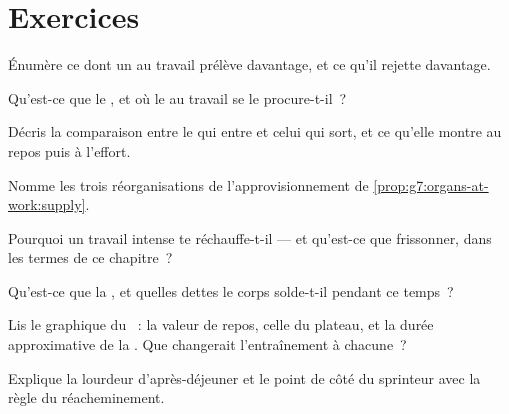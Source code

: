 \section{Exercices}

\begin{exercise}[$\star$]\label{exo:g7:organs-at-work:1}
Énumère ce dont un  au travail prélève davantage, et ce qu'il
rejette davantage.
\end{exercise}

\begin{exercise}[$\star$]\label{exo:g7:organs-at-work:2}
Qu'est-ce que le , et où le  au travail se le
procure-t-il~?
\end{exercise}

\begin{exercise}[$\star$]\label{exo:g7:organs-at-work:3}
Décris la comparaison entre le  qui entre et celui qui sort, et
ce qu'elle montre au repos puis à l'effort.
\end{exercise}

\begin{exercise}[$\star$]\label{exo:g7:organs-at-work:4}
Nomme les trois réorganisations de l'approvisionnement de
\cref{prop:g7:organs-at-work:supply}.
\end{exercise}

\begin{exercise}[$\star$]\label{exo:g7:organs-at-work:5}
Pourquoi un travail intense te réchauffe-t-il --- et qu'est-ce que
frissonner, dans les termes de ce chapitre~?
\end{exercise}

\begin{exercise}[$\star$]\label{exo:g7:organs-at-work:6}
Qu'est-ce que la , et quelles dettes le corps
solde-t-il pendant ce temps~?
\end{exercise}

\begin{exercise}[$\star\star$]\label{exo:g7:organs-at-work:7}
Lis le graphique du ~: la valeur de repos, celle du plateau, et
la durée approximative de la . Que changerait
l'entraînement à chacune~?
\end{exercise}

\begin{exercise}[$\star\star$]\label{exo:g7:organs-at-work:8}
Explique la lourdeur d'après-déjeuner et le point de côté du
sprinteur avec la règle du réacheminement.
\end{exercise}

